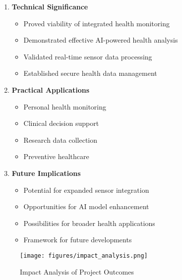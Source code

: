 \begin{enumerate}
    \item \textbf{Technical Significance}
    \begin{itemize}
        \item Proved viability of integrated health monitoring
        \item Demonstrated effective AI-powered health analysis
        \item Validated real-time sensor data processing
        \item Established secure health data management
    \end{itemize}

    \item \textbf{Practical Applications}
    \begin{itemize}
        \item Personal health monitoring
        \item Clinical decision support
        \item Research data collection
        \item Preventive healthcare
    \end{itemize}

    \item \textbf{Future Implications}
    \begin{itemize}
        \item Potential for expanded sensor integration
        \item Opportunities for AI model enhancement
        \item Possibilities for broader health applications
        \item Framework for future developments
    \end{itemize}
\end{enumerate}

\begin{figure}[H]
    \centering
    \texttt{[image: figures/impact\_analysis.png]}
    \caption{Impact Analysis of Project Outcomes}
\end{figure} 